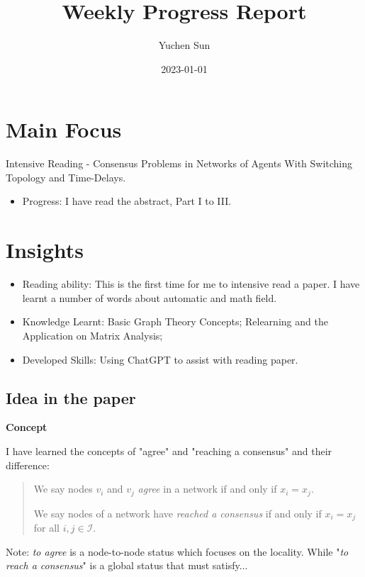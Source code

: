 \documentclass{article}
\title{Weekly Progress Report}
\author{Yuchen Sun}
\date{2023-01-01}
\begin{document}
\maketitle
\section*{Main Focus}

Intensive Reading - Consensus Problems in Networks of Agents With Switching Topology and Time-Delays.

\begin{itemize}
    \item Progress: I have read the abstract, Part I to III.
\end{itemize}

\section*{Insights}

\begin{itemize}
    \item Reading ability: This is the first time for me to intensive read a paper. I have learnt a number of words about automatic and math field.
    \item Knowledge Learnt: Basic Graph Theory Concepts; Relearning and the Application on Matrix Analysis;
    \item Developed Skills: Using ChatGPT to assist with reading paper.
\end{itemize}

\subsection*{Idea in the paper}

\noindent\textbf{Concept}

I have learned the concepts of "agree" and "reaching a consensus" and their difference:

\begin{quote}
We say nodes \( v_i \) and \( v_j \) \textit{agree} in a network if and only if \( x_i = x_j \).

We say nodes of a network have \textit{reached a consensus} if and only if \( x_i = x_j \) for all \( i, j \in \mathcal{I} \).
\end{quote}

Note: \textit{to agree} is a node-to-node status which focuses on the locality. While "\textit{to reach a consensus}" is a global status that must satisfy...
\end{document}
